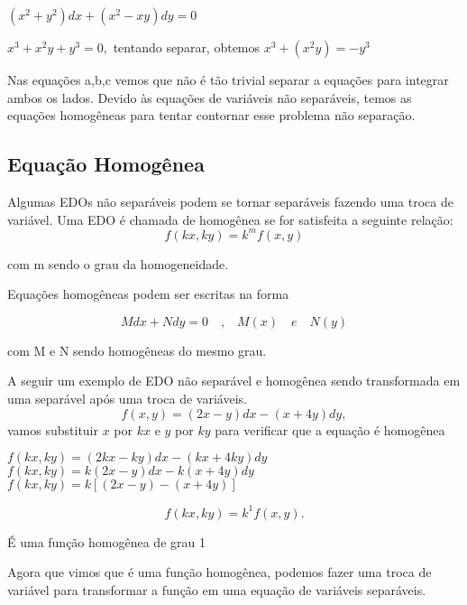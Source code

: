  $ (x^2 + y^2 )dx + (x^2 -xy)dy = 0 $


$ x^3 + x^2y +y^3  = 0, $ tentando separar, obtemos $ x^3 + (x^2y) = -y^3 $


Nas equações a,b,c vemos que não é tão trivial separar a equações para integrar ambos os lados. Devido às equações de variáveis não separáveis, temos as equações homogêneas para tentar contornar esse problema não separação.

\subsection[Equação Homogênea]{Equação Homogênea}
Algumas EDOs não separáveis podem se tornar separáveis fazendo uma troca de variável. Uma EDO é chamada de homogênea se for satisfeita a seguinte relação:
\begin{equation}
f(kx,ky) = k^m f(x,y) 
\end{equation}
\begin{center}
com m sendo o grau da homogeneidade.
\end{center}


Equações homogêneas podem ser escritas na forma 

\begin{equation}
Mdx + Ndy = 0  \quad \textrm{,} \quad M(x)\quad  e  \quad N(y)
\end{equation}
\begin{center}
com M e N sendo homogêneas do  mesmo grau.
\end{center}

A seguir um exemplo de EDO não separável e homogênea sendo transformada em uma separável após uma troca de variáveis.
\begin{equation}
f(x,y) = (2x - y )dx - (x + 4y)dy, 
\end{equation}
vamos substituir $x$ por $kx$ e $y$ por $ky$ para verificar que a equação é homogênea

\begin{center}
$ f(kx,ky) = (2kx - ky)dx  - (kx + 4ky)dy$ \\
$ f(kx,ky) = k(2x - y)dx - k(x + 4y)dy  $ \\
$ f(kx,ky) = k[(2x - y) - (x + 4y)] $ 
\end{center}
\begin{equation}
f(kx,ky) = k^1 f(x,y).
\end{equation}

É uma função homogênea de grau 1

Agora que vimos que é uma função homogênea, podemos fazer uma troca de variável para transformar a função em uma equação de variáveis separáveis. 


